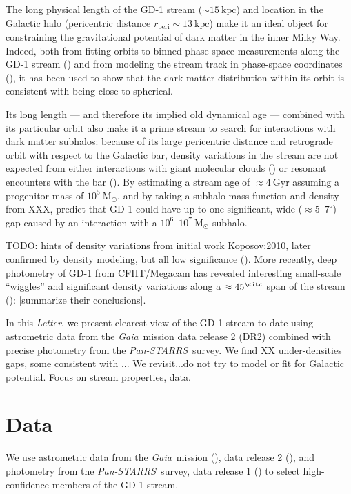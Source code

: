 \documentclass[modern]{aastex62}
\newcommand{\acronym}[1]{{\small{#1}}}
\newcommand{\gaia}{\textsl{Gaia}}
\newcommand{\pans}{\textsl{Pan-STARRS}}
\newcommand{\DR}{\acronym{DR2}}
\newcommand{\msun}{\textrm{M}_\odot}
\newcommand{\kpc}{\textrm{kpc}}
\newcommand{\article}{\textsl{Letter}}
\begin{document}
The long physical length of the GD-1 stream ($\sim 15~\kpc$) and location in the
Galactic halo (pericentric distance $r_\textrm{peri} \sim 13~\kpc$) make it an
ideal object for constraining the gravitational potential of dark matter in the
inner Milky Way.
Indeed, both from fitting orbits to binned phase-space measurements along the
GD-1 stream (\citealt{Koposov:2010}) and from modeling the stream track in
phase-space coordinates (\citealt{Bovy:2016}), it has been used to show that the
dark matter distribution within its orbit is consistent with being close to
spherical.

Its long length --- and therefore its implied old dynamical age --- combined
with its particular orbit also make it a prime stream to search for interactions
with dark matter subhalos:
because of its large pericentric distance and retrograde orbit with respect to
the Galactic bar, density variations in the stream are not expected from either
interactions with giant molecular clouds (\citealt{Amorisco:2016}) or resonant
encounters with the bar (\citealt{Pearson:2017}).
By estimating a stream age of $\approx 4~\textrm{Gyr}$ assuming a progenitor
mass of $10^5~\msun$, and by taking a subhalo mass function and density from
XXX, \citet{Erkal:2016} predict that GD-1 could have up to one significant, wide
($\approx 5$--$7^\circ$) gap caused by an interaction with a
$10^6$--$10^7~\msun$ subhalo.

TODO: hints of density variations from initial work Koposov:2010, later confirmed by density modeling, but all low significance
(\citealt{Carlberg:2013}).
More recently, deep photometry of GD-1 from CFHT/Megacam has revealed
interesting small-scale ``wiggles'' and significant density variations along a $\approx 45^\citc$ span of the stream (\citealt{DeBoer:2017}):
[summarize their conclusions].

In this \article, we present clearest view of the GD-1 stream to date using
astrometric data from the \gaia\ mission data release 2 (\DR) combined with
precise photometry from the \pans\ survey.
We find XX under-densities gaps, some consistent with ...
We revisit...do not try to model or fit for Galactic potential.
Focus on stream properties, data.

\section{Data}
\label{sec:data}

We use astrometric data from the \gaia\ mission (\citealt{Prusti:2016}), data
release 2 (\citealt{Gaia-Collaboration:2018, Lindegren:2018}), and photometry
from the \pans\ survey, data release 1 (\citealt{Chambers:2016}) to select
high-confidence members of the GD-1 stream.
\end{document}
